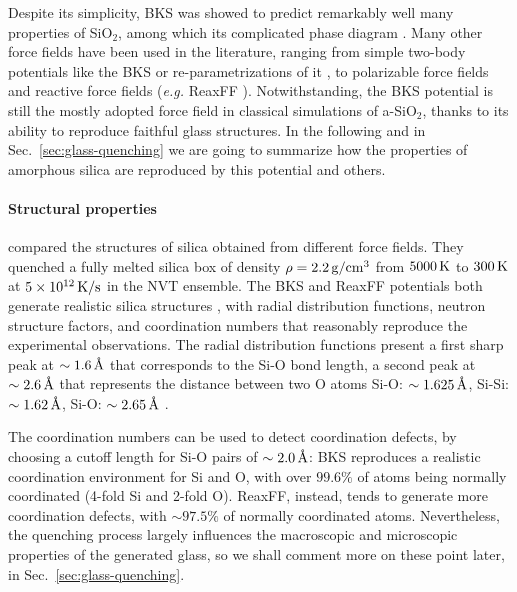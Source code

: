 Despite its simplicity, BKS was showed to predict remarkably well many properties of SiO$_2$, among which its complicated phase diagram \cite{Saika2004}. 
Many other force fields have been used in the literature, ranging from simple two-body potentials like the BKS or re-parametrizations of it \cite{Carre2008}, to polarizable force fields \cite{Tangney2002} and reactive force fields (\emph{e.g.} ReaxFF \cite{Yuan2001}). 
Notwithstanding, the BKS potential is still the mostly adopted force field in classical simulations of a-SiO$_2$, thanks to its ability to reproduce faithful glass structures. 
In the following and in Sec.~\ref{sec:glass-quenching} we are going to summarize how the properties of amorphous silica are reproduced by this potential and others.

\paragraph{Structural properties}
\citet{Tian2017} compared the structures of silica obtained from different force fields. They quenched a fully melted silica box of density $\rho=2.2\,\mathrm{g/cm^3}$ from $5000\,\mathrm{K}$ to $300\,\mathrm{K}$ at $5\times 10^{12}\,\mathrm{K/s}$ in the NVT ensemble. 
The BKS and ReaxFF potentials both generate realistic silica structures \cite{Vollmayr1996,Yuan2001}, with radial distribution functions, neutron structure factors, and coordination numbers that reasonably reproduce the experimental observations.
The radial distribution functions present a first sharp peak at $\sim 1.6\,\mathrm{{\mbox{\AA}}}$ that corresponds to the Si-O bond length, a second peak at $\sim 2.6\,\mathrm{{\mbox{\AA}}}$ that represents the distance between two O atoms
Si-O: $\sim 1.625\,\mathrm{{\mbox{\AA}}}$, Si-Si: $\sim 1.62\,\mathrm{{\mbox{\AA}}}$, Si-O: $\sim 2.65\,\mathrm{{\mbox{\AA}}}$ \cite{Bhattarai2016}.

The coordination numbers can be used to detect coordination defects, by choosing a cutoff length for Si-O pairs of $\sim 2.0\,\mathrm{{\mbox{\AA}}}$: BKS reproduces a realistic coordination environment for Si and O, with over $99.6\%$ of atoms being normally coordinated (4-fold Si and 2-fold O). ReaxFF, instead, tends to generate more coordination defects, with $\sim 97.5\%$ of normally coordinated atoms.
Nevertheless, the quenching process largely influences the macroscopic and microscopic properties of the generated glass, so we shall comment more on these point later, in Sec.~\ref{sec:glass-quenching}. 

